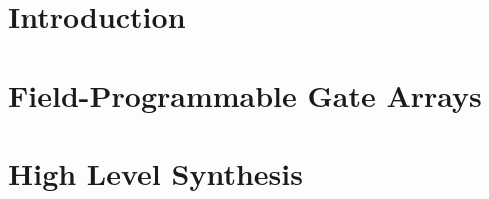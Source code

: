 \section{Introduction}
\label{reconfigurableComputing:introduction}


\section{Field-Programmable Gate Arrays}
\label{fpga}


\section{High Level Synthesis}
\label{hls}
